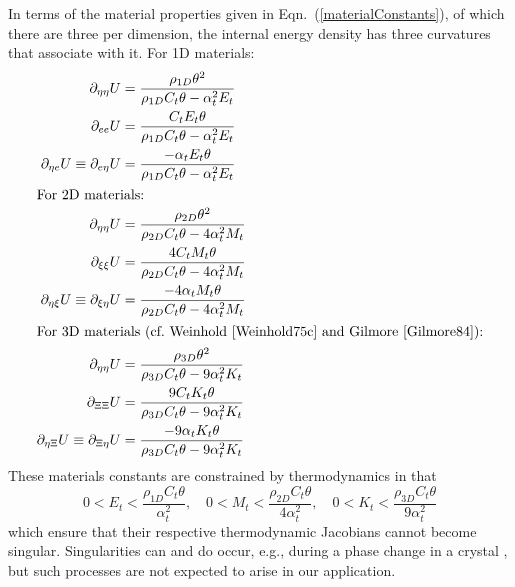 In terms of the material properties given in Eqn.~(\ref{materialConstants}), of which there are three per dimension, the internal energy density has three curvatures that associate with it.  For 1D materials:
\begin{subequations}
    \label{internalEnergies}
    \begin{align}
    \partial_{\eta\eta} U & = 
    \frac{\rho_{1D} \theta^2}
    {\rho_{1D} C_t \theta - \alpha^2_t E_t} \\
    \partial_{ee} U & = \frac{C_t E_t \theta}
    {\rho_{1D} C_t \theta - \alpha^2_t E_t} \\
    \partial_{\eta e} U \equiv \partial_{e \eta} U & = 
    \frac{-\alpha_t E_t \theta}
    {\rho_{1D} C_t \theta - \alpha^2_t E_t} \\
    \intertext{For 2D materials:}
    \partial_{\eta\eta} U & = 
    \frac{\rho_{2D} \theta^2}
    {\rho_{2D} C_t \theta - 4 \alpha^2_t M_t} \\
    \partial_{\xi\xi} U & = \frac{4 C_t M_t \theta}
    {\rho_{2D} C_t \theta - 4 \alpha^2_t M_t} \\
    \partial_{\eta \xi} U \equiv \partial_{\xi \eta} U & = 
    \frac{-4 \alpha_t M_t \theta}
    {\rho_{2D} C_t \theta - 4 \alpha^2_t M_t} \\
    \intertext{For 3D materials (cf.\ Weinhold \cite{Weinhold75c} and Gilmore \cite{Gilmore84}):}
    \partial_{\eta\eta} U & = 
    \frac{\rho_{3D} \theta^2}
    {\rho_{3D} C_t \theta - 9 \alpha^2_t K_t} \\
    \partial_{\Xi\Xi} U & = \frac{9 C_t K_t \theta}
    {\rho_{3D} C_t \theta - 9 \alpha^2_t K_t} \\
    \partial_{\eta\Xi} U \equiv 
    \partial_{\Xi\eta} U & = 
    \frac{-9 \alpha_t K_t \theta}
    {\rho_{3D} C_t \theta - 9 \alpha^2_t K_t}
    \end{align}
\end{subequations}
These materials constants are constrained by thermo\-dynamics in that
\begin{equation}
    \label{thermodynamicConstraints}
    0 < E_t < \frac{\rho_{1D} C_t \theta}{\alpha^2_t} , \quad
    0 < M_t < \frac{\rho_{2D} C_t \theta}{4 \alpha^2_t} , \quad
    0 < K_t < \frac{\rho_{3D} C_t \theta}{9 \alpha^2_t} 
\end{equation} 
which ensure that their respective thermo\-dynamic Jacobians cannot become singular. Singularities can and do occur, e.g., during a phase change in a crystal \cite{McLellan76,Gilmore84}, but such processes are not expected to arise in our application.

